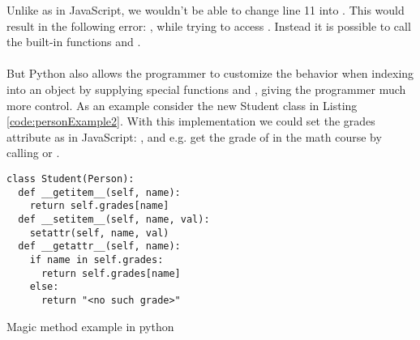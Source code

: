 Unlike as in JavaScript, we wouldn't be able to change line 11 into . This would result in the following error: , while trying to access . Instead it is possible to call the built-in functions  and . \\
\\
But Python also allows the programmer to customize the behavior when indexing into an object by supplying special functions  and , giving the programmer much more control. As an example consider the new Student class in Listing \ref{code:personExample2}. With this implementation we could set the grades attribute as in JavaScript: , and e.g. get the grade of  in the math course by calling  or .

\begin{listing}[H]
\begin{verbatim}
class Student(Person):
  def __getitem__(self, name):
    return self.grades[name]
  def __setitem__(self, name, val):
    setattr(self, name, val)
  def __getattr__(self, name):
    if name in self.grades:
      return self.grades[name]
    else:
      return "<no such grade>"
\end{verbatim}
	\caption{Magic method example in python}
	\label{code:personExample2}
\end{listing}